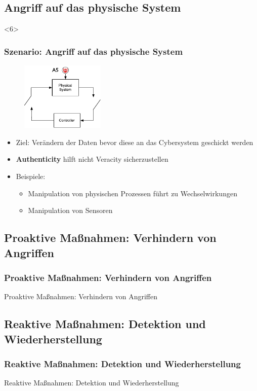 \documentclass{sikslides}
\begin{document}
    \subsection{Angriff auf das physische System}
    \begin{frame}
        <6>
        \frametitle{Szenario: Angriff auf das physische System}
        \begin{figure}
            \centering
            \includegraphics[width=4cm]{figure/physical}
        \end{figure}
        \begin{itemize}
            \item Ziel: Verändern der Daten bevor diese an das Cybersystem geschickt werden
            \item \textbf{Authenticity} hilft nicht Veracity sicherzustellen
            \item Beispiele:
            \begin{itemize}
                \item Manipulation von physischen Prozessen führt zu Wechselwirkungen
                \item Manipulation von Sensoren
            \end{itemize}
        \end{itemize}
    \end{frame}


    \subsection{Proaktive Maßnahmen: Verhindern von Angriffen}
    \begin{frame}
        \frametitle{Proaktive Maßnahmen: Verhindern von Angriffen}
        Proaktive Maßnahmen: Verhindern von Angriffen
    \end{frame}
    \subsection{Reaktive Maßnahmen: Detektion und Wiederherstellung}
    \begin{frame}
        \frametitle{Reaktive Maßnahmen: Detektion und Wiederherstellung}
        Reaktive Maßnahmen: Detektion und Wiederherstellung
    \end{frame}

\end{document}
